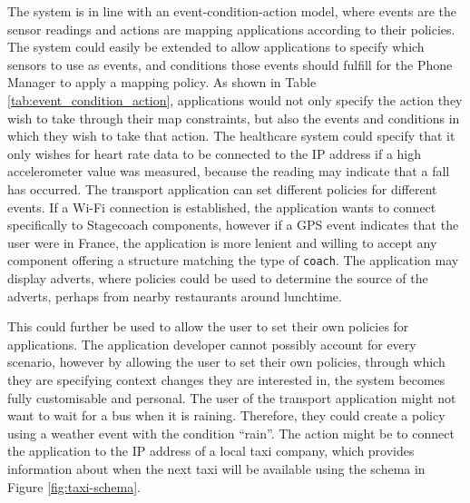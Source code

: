 \documentclass[12pt,twoside,notitlepage]{report}
\begin{document}
The system is in line with an event-condition-action model, where events are the sensor readings and actions are mapping applications according to their policies. 
The system could easily be extended to allow applications to specify which sensors to use as events, and conditions those events should fulfill for the Phone Manager to apply a mapping policy. 
As shown in Table \ref{tab:event_condition_action}, applications would not only specify the action they wish to take through their map constraints, but also the events and conditions in which they wish to take that action.
The healthcare system could specify that it only wishes for heart rate data to be connected to the IP address if a high accelerometer value was measured, because the reading may indicate that a fall has occurred. 
The transport application can set different policies for different events. If a Wi-Fi connection is established, the application wants to connect specifically to Stagecoach components, however if a GPS event indicates that the user were in France, the application is more lenient and willing to accept any component offering a structure matching the type of {\tt coach}. 
The application may display adverts, where policies could be used to determine the source of the adverts, perhaps from nearby restaurants around lunchtime. 

This could further be used to allow the user to set their own policies for applications. 
The application developer cannot possibly account for every scenario, however by allowing the user to set their own policies, through which they are specifying context changes they are interested in, the system becomes fully customisable and personal. 
The user of the transport application might not want to wait for a bus when it is raining. 
Therefore, they could create a policy using a weather event with the condition ``rain''. 
The action might be to connect the application to the IP address of a local taxi company, which provides information about when the next taxi will be available using the schema in Figure \ref{fig:taxi-schema}.




\end{document}
